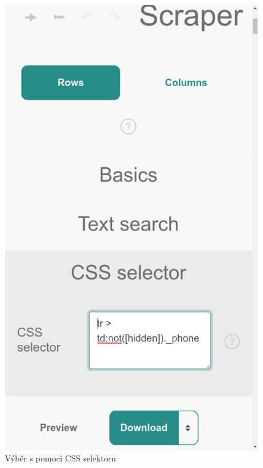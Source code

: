 \documentclass[thesis=B,czech]{FITthesis}[2012/06/26]
\begin{document}
\begin{figure}[h]
\begin{minipage}{.5\linewidth}
		\includegraphics[width=.9\linewidth]{images/Scraper_css_selector.png}
		\caption{Výběr s pomocí CSS selektoru}
		\label{fig:scraper_css_selector}
	\end{minipage}
\end{figure}
\end{document}
